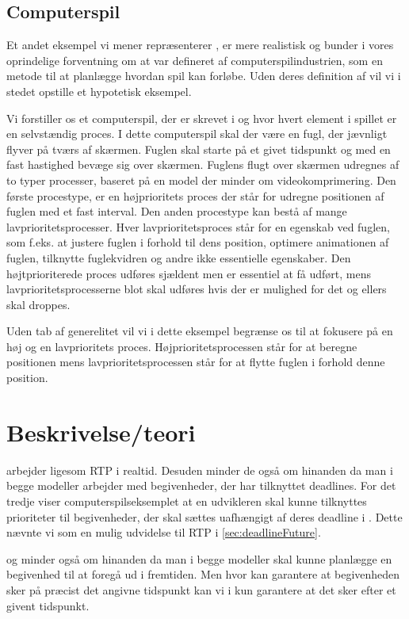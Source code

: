 \subsection{Computerspil}
Et andet eksempel vi mener repræsenterer  \is, er mere realistisk og bunder i vores oprindelige forventning om at \is  var defineret af computerspilindustrien, som en metode til at planlægge hvordan spil kan forløbe. Uden deres definition af \is vil vi i stedet opstille et hypotetisk eksempel. 

Vi forstiller os et computerspil, der er skrevet i \pycsp og hvor hvert element i spillet er en selvstændig proces. I dette computerspil skal der være en fugl, der jævnligt flyver på tværs af skærmen. Fuglen skal starte på et givet tidspunkt og med en fast hastighed bevæge sig over skærmen. Fuglens flugt over skærmen udregnes af to typer processer, baseret på en model der minder om videokomprimering. Den første procestype, er en højprioritets proces der står for udregne positionen af fuglen med  et fast interval. Den anden procestype kan bestå af mange lavprioritetsprocesser. Hver lavprioritetsproces står for en egenskab ved fuglen, som  f.eks. at justere fuglen i forhold til dens position, optimere animationen af fuglen, tilknytte fuglekvidren og andre ikke essentielle egenskaber. Den højtprioriterede proces udføres sjældent men er essentiel at få udført, mens lavprioritetsprocesserne blot skal udføres hvis der er mulighed for det og ellers skal droppes.

Uden tab af generelitet vil vi i dette eksempel begrænse os til at fokusere på en høj og en lavprioritets proces. Højprioritetsprocessen står for at beregne positionen mens lavprioritetsprocessen står for at flytte fuglen i forhold denne position.

\section{Beskrivelse/teori}

\is arbejder ligesom RTP i realtid. Desuden minder de også om hinanden da man i begge modeller arbejder med begivenheder, der har tilknyttet deadlines. For det tredje viser computerspilseksemplet at en udvikleren skal kunne tilknyttes prioriteter til begivenheder, der skal sættes uafhængigt af deres deadline i \is. Dette nævnte vi som en mulig udvidelse til RTP i \cref{sec:deadlineFuture}.

\is og \des minder også om hinanden da man i begge modeller skal kunne planlægge en begivenhed til at foregå ud i fremtiden. Men hvor \des kan garantere at begivenheden sker på præcist det angivne tidspunkt kan vi i \is kun garantere at det sker efter et givent tidspunkt.


